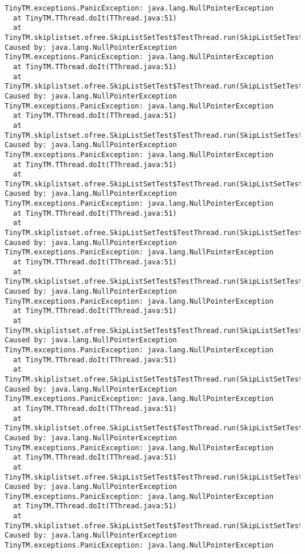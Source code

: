 \begin{verbatim}
TinyTM.exceptions.PanicException: java.lang.NullPointerException
  at TinyTM.TThread.doIt(TThread.java:51)
  at
TinyTM.skiplistset.ofree.SkipListSetTest$TestThread.run(SkipListSetTest.java:128)
Caused by: java.lang.NullPointerException
TinyTM.exceptions.PanicException: java.lang.NullPointerException
  at TinyTM.TThread.doIt(TThread.java:51)
  at
TinyTM.skiplistset.ofree.SkipListSetTest$TestThread.run(SkipListSetTest.java:128)
Caused by: java.lang.NullPointerException
TinyTM.exceptions.PanicException: java.lang.NullPointerException
  at TinyTM.TThread.doIt(TThread.java:51)
  at
TinyTM.skiplistset.ofree.SkipListSetTest$TestThread.run(SkipListSetTest.java:128)
Caused by: java.lang.NullPointerException
TinyTM.exceptions.PanicException: java.lang.NullPointerException
  at TinyTM.TThread.doIt(TThread.java:51)
  at
TinyTM.skiplistset.ofree.SkipListSetTest$TestThread.run(SkipListSetTest.java:128)
Caused by: java.lang.NullPointerException
TinyTM.exceptions.PanicException: java.lang.NullPointerException
  at TinyTM.TThread.doIt(TThread.java:51)
  at
TinyTM.skiplistset.ofree.SkipListSetTest$TestThread.run(SkipListSetTest.java:128)
Caused by: java.lang.NullPointerException
TinyTM.exceptions.PanicException: java.lang.NullPointerException
  at TinyTM.TThread.doIt(TThread.java:51)
  at
TinyTM.skiplistset.ofree.SkipListSetTest$TestThread.run(SkipListSetTest.java:128)
Caused by: java.lang.NullPointerException
TinyTM.exceptions.PanicException: java.lang.NullPointerException
  at TinyTM.TThread.doIt(TThread.java:51)
  at
TinyTM.skiplistset.ofree.SkipListSetTest$TestThread.run(SkipListSetTest.java:128)
Caused by: java.lang.NullPointerException
TinyTM.exceptions.PanicException: java.lang.NullPointerException
  at TinyTM.TThread.doIt(TThread.java:51)
  at
TinyTM.skiplistset.ofree.SkipListSetTest$TestThread.run(SkipListSetTest.java:128)
Caused by: java.lang.NullPointerException
TinyTM.exceptions.PanicException: java.lang.NullPointerException
  at TinyTM.TThread.doIt(TThread.java:51)
  at
TinyTM.skiplistset.ofree.SkipListSetTest$TestThread.run(SkipListSetTest.java:128)
Caused by: java.lang.NullPointerException
TinyTM.exceptions.PanicException: java.lang.NullPointerException
  at TinyTM.TThread.doIt(TThread.java:51)
  at
TinyTM.skiplistset.ofree.SkipListSetTest$TestThread.run(SkipListSetTest.java:128)
Caused by: java.lang.NullPointerException
TinyTM.exceptions.PanicException: java.lang.NullPointerException
  at TinyTM.TThread.doIt(TThread.java:51)
  at
TinyTM.skiplistset.ofree.SkipListSetTest$TestThread.run(SkipListSetTest.java:128)
Caused by: java.lang.NullPointerException
TinyTM.exceptions.PanicException: java.lang.NullPointerException

\end{verbatim}
